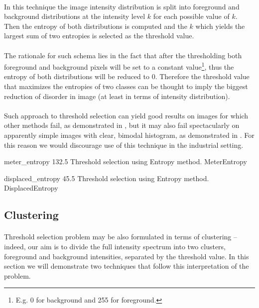 \paragraph*{}
In this technique the image intensity distribution is split into foreground and background distributions at the intensity level $k$ for each possible value of $k$. Then the entropy of both distributions is computed and the $k$ which yields the largest sum of two entropies is selected as the threshold value.

\paragraph*{}
The rationale for such schema lies in the fact that after the thresholding both foreground and background pixels will be set to a constant value\footnote{E.g. 0 for background and 255 for foreground.}, thus the entropy of both distributions will be reduced to 0. Therefore the threshold value that maximizes the entropies of two classes can be thought to imply the biggest reduction of disorder in image (at least in terms of intensity distribution).

\paragraph*{}
Such approach to threshold selection can yield good results on images for which other methods fail, as demonstrated in , but it may also fail spectacularly on apparently simple images with clear, bimodal histogram, as demonstrated in . For this reason we would discourage use of this technique in the industrial setting.

\thresholdFigure
{meter_entropy}
{132.5}
{Threshold selection using Entropy method.}
{MeterEntropy}

\thresholdFigure
{displaced_entropy}
{45.5}
{Threshold selection using Entropy method.}
{DisplacedEntropy}

\subsection{Clustering}

\paragraph*{}
Threshold selection problem may be also formulated in terms of clustering -- indeed, our aim is to divide the full intensity spectrum into two clusters, foreground and background intensities, separated by the threshold value. In this section we will demonstrate two techniques that follow this interpretation of the problem. 

